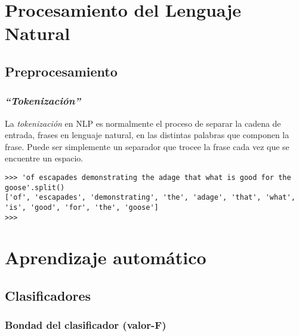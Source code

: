 
\chapter{Procesamiento del Lenguaje Natural}

\section{Preprocesamiento}

\subsection[Tokenización]{\emph{``Tokenización''}}

La \emph{tokenización} en NLP es normalmente el proceso de separar la cadena de entrada, frases en lenguaje natural, en las distintas palabras que componen la frase. Puede ser simplemente un separador que trocee la frase cada vez que se encuentre un espacio.
\begin{verbatim}
>>> 'of escapades demonstrating the adage that what is good for the goose'.split()
['of', 'escapades', 'demonstrating', 'the', 'adage', 'that', 'what', 'is', 'good', 'for', 'the', 'goose']
>>> 
\end{verbatim}


\chapter{Aprendizaje automático}

\section{Clasificadores}

\subsection{Bondad del clasificador (valor-F)}


